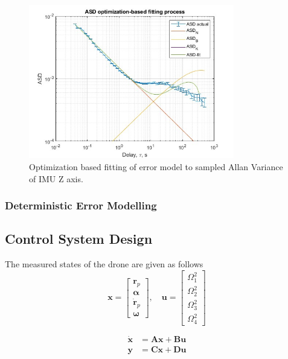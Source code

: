\documentclass{article}
\begin{document}
\begin{figure}[H]
    \centering
    \includegraphics[width=0.8\textwidth]{AV_Z.jpg}
    \caption{Optimization based fitting of error model to sampled Allan Variance of IMU Z axis.}
\end{figure}

\subsubsection{Deterministic Error Modelling}


\subsection{Control System Design}

The measured states of the drone are given as follows
\begin{equation}
    \mathbf{x} = \begin{bmatrix} \mathbf{r}_p \\ \boldsymbol{\alpha} \\ \mathbf{\dot{r}}_p \\  \boldsymbol{\omega}  \end{bmatrix}, \quad \mathbf{u} = \begin{bmatrix} \Omega_1^2 \\ \Omega_2^2 \\ \Omega_3^2 \\ \Omega_4^2 \end{bmatrix}
\end{equation}

\begin{align}
    \mathbf{\dot{x}} &= \mathbf{Ax} + \mathbf{Bu} \\
    \mathbf{y} &= \mathbf{Cx} + \mathbf{Du}
\end{align}
\end{document}
